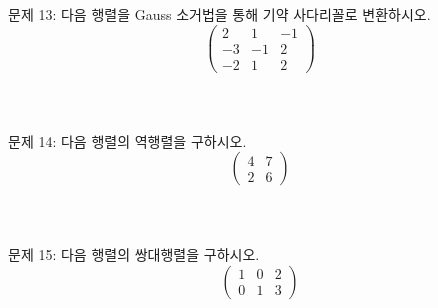 \documentclass[fleqn]{article}
\begin{document}
\noindent 문제 13: 다음 행렬을 Gauss 소거법을 통해 기약 사다리꼴로 변환하시오.
\[
\begin{pmatrix} 2 & 1 & -1 \\ -3 & -1 & 2 \\ -2 & 1 & 2 \end{pmatrix}
\]
\\\\\\

\noindent 문제 14: 다음 행렬의 역행렬을 구하시오.
\[
\begin{pmatrix} 4 & 7 \\ 2 & 6 \end{pmatrix}
\]
\\\\\\

\noindent 문제 15: 다음 행렬의 쌍대행렬을 구하시오.
\[
\begin{pmatrix} 1 & 0 & 2 \\ 0 & 1 & 3 \end{pmatrix}
\]
\\\\\\
\end{document}
